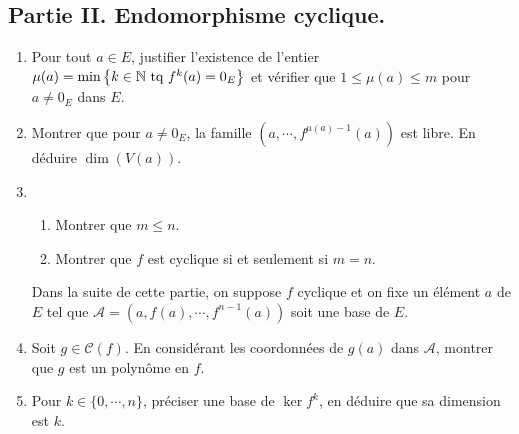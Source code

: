 \subsection*{Partie II. Endomorphisme cyclique.}
\begin{enumerate}
 \item Pour tout $a\in E$, justifier l'existence de l'entier $\mu(a)=\min\left\lbrace k\in \mathbb{N}\text{ tq } f^k(a)=0_E \right\rbrace$ et vérifier que $1 \leq \mu(a) \leq m$ pour $a\neq 0_E$ dans $E$.
 \item Montrer que pour $a\neq 0_E$, la famille $(a,\cdots,f^{\mu(a)-1}(a))$ est libre. En déduire $\dim (V(a))$.
 \item 
\begin{enumerate}
\item Montrer que $m\leq n$.
\item Montrer que $f$ est cyclique si et seulement si $m=n$.
\end{enumerate}
Dans la suite de cette partie, on suppose $f$ cyclique et on fixe un élément $a$ de $E$ tel que $\mathcal{A}=(a,f(a),\cdots, f^{n-1}(a))$ soit une base de $E$.
 \item Soit $g\in \mathcal{C}(f)$. En considérant les coordonnées de $g(a)$ dans $\mathcal{A}$, montrer que $g$ est un polynôme en $f$.
 \item Pour $k\in \{0,\cdots,n\}$, préciser une base de $\ker f^k$, en déduire que sa dimension est $k$.
\end{enumerate}

